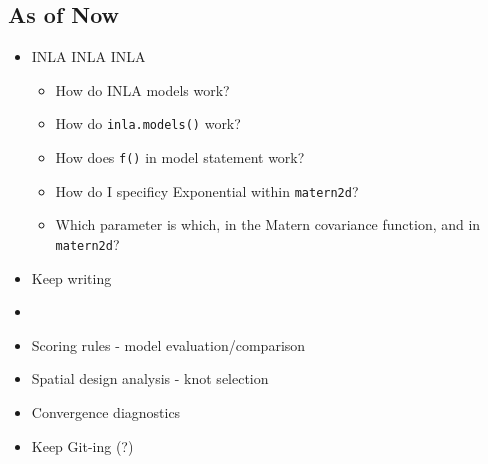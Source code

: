 \documentclass{article}
\begin{document}
\subsection*{As of Now}
\begin{itemize}
\item INLA INLA INLA
  \begin{itemize}
  \item How do INLA models work?  
  \item How do \verb|inla.models()| work? 
  \item How does \verb|f()| in model statement work?
  \item How do I specificy Exponential within \verb|matern2d|?
  \item Which parameter is which, in the Matern covariance function, and in \verb|matern2d|?
  \end{itemize}
\item Keep writing
\item 
\item Scoring rules - model evaluation/comparison
\item Spatial design analysis - knot selection
\item Convergence diagnostics
\item Keep Git-ing (?)
\end{itemize}

% 

\end{document}
